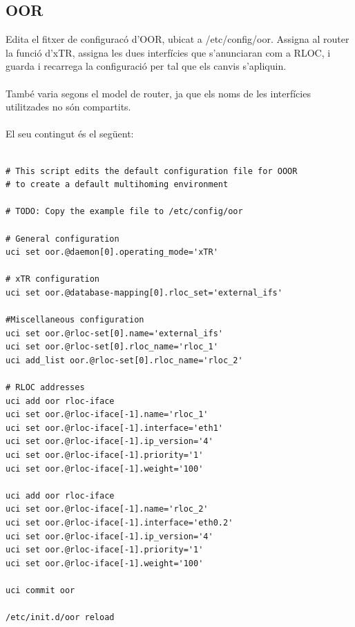 \documentclass[11pt]{article}
\begin{document}
\subsection{OOR}
Edita el fitxer de configuracó d’OOR, ubicat a /etc/config/oor. Assigna al router la funció d’xTR, assigna les dues interfícies que s’anunciaran com a RLOC, i guarda i recarrega la configuració per tal que els canvis s’apliquin.\\
\\
També varia segons el model de router, ja que els noms de les interfícies utilitzades no són compartits.\\
\\
El seu contingut és el següent:\\
\lstset{caption=Script de configuració d'OOR: WNDR3800}
\begin{lstlisting}[frame=single]

# This script edits the default configuration file for OOOR
# to create a default multihoming environment

# TODO: Copy the example file to /etc/config/oor

# General configuration
uci set oor.@daemon[0].operating_mode='xTR'

# xTR configuration
uci set oor.@database-mapping[0].rloc_set='external_ifs'

#Miscellaneous configuration
uci set oor.@rloc-set[0].name='external_ifs'
uci set oor.@rloc-set[0].rloc_name='rloc_1'
uci add_list oor.@rloc-set[0].rloc_name='rloc_2'

# RLOC addresses
uci add oor rloc-iface
uci set oor.@rloc-iface[-1].name='rloc_1'
uci set oor.@rloc-iface[-1].interface='eth1'
uci set oor.@rloc-iface[-1].ip_version='4'
uci set oor.@rloc-iface[-1].priority='1'
uci set oor.@rloc-iface[-1].weight='100'

uci add oor rloc-iface
uci set oor.@rloc-iface[-1].name='rloc_2'
uci set oor.@rloc-iface[-1].interface='eth0.2'
uci set oor.@rloc-iface[-1].ip_version='4'
uci set oor.@rloc-iface[-1].priority='1'
uci set oor.@rloc-iface[-1].weight='100'

uci commit oor

/etc/init.d/oor reload
\end{lstlisting}
\newpage
\lstset{caption=Script de configuració d'OOR: WRT1200AC}
\end{document}
